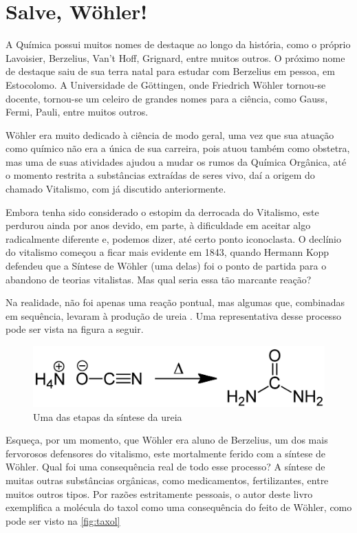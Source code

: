 \documentclass[a4paper,12pt]{book}
\begin{document}
\chapter{Salve, Wöhler!}
A Química possui muitos nomes de destaque ao longo da história, como o próprio Lavoisier, Berzelius, Van't Hoff, Grignard, entre muitos outros. O próximo nome de destaque saiu de sua terra natal para estudar com Berzelius em pessoa, em Estocolomo. A Universidade de Göttingen, onde Friedrich Wöhler  tornou-se docente, tornou-se um celeiro de grandes nomes para a ciência, como Gauss, Fermi, Pauli, entre muitos outros.

Wöhler era muito dedicado à ciência de modo geral, uma vez que sua atuação como químico não era a única de sua carreira, pois atuou também como obstetra, mas uma de suas atividades ajudou a mudar os rumos da Química Orgânica, até o momento restrita a substâncias extraídas de seres vivo, daí a origem do chamado Vitalismo, com já discutido anteriormente.

Embora tenha sido considerado o estopim da derrocada do Vitalismo, este perdurou ainda por anos devido, em parte, à dificuldade em aceitar algo radicalmente diferente e, podemos dizer, até certo ponto iconoclasta. O declínio do vitalismo começou a ficar mais evidente em 1843, quando Hermann Kopp defendeu que a Síntese de Wöhler (uma delas) foi o ponto de partida para o abandono de teorias vitalistas. Mas qual seria essa tão marcante reação?

Na realidade, não foi apenas uma reação pontual, mas algumas que, combinadas em sequência, levaram à produção de ureia . Uma representativa desse processo pode ser vista na figura a seguir.

\begin{figure}[h]
	\centering
	\caption{Uma das etapas da síntese da ureia}
	\vspace{0.5cm}
	\label{fig:captura-de-tela-de-2023-07-15-20-28-19}
	\includegraphics[width=0.7\linewidth]{imagens/Urea_Synthesis_Woehler.png}
\end{figure}

Esqueça, por um momento, que Wöhler era aluno de Berzelius, um dos mais fervorosos defensores do vitalismo, este mortalmente ferido com a síntese de Wöhler. Qual foi uma consequência real de todo esse processo? A síntese de muitas outras substâncias orgânicas, como medicamentos, fertilizantes, entre muitos outros tipos. Por razões estritamente pessoais, o autor deste livro exemplifica a molécula do taxol  como uma consequência do feito de Wöhler, como pode ser visto na \ref{fig:taxol}
\end{document}
